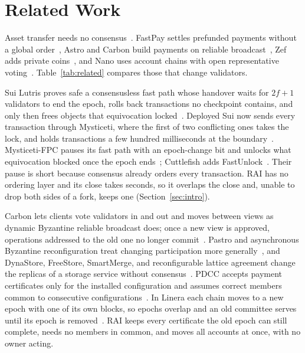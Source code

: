 \section{Related Work}
\label{sec:related}



Asset transfer needs no consensus~\cite{consensusnumber}. FastPay settles prefunded payments without a global order~\cite{fastpay}, Astro and Carbon build payments on reliable broadcast~\cite{astro,camaioni2024carbon}, Zef adds private coins~\cite{zef}, and Nano uses account chains with open representative voting~\cite{nano}. Table~\ref{tab:related} compares those that change validators.

Sui Lutris proves safe a consensusless fast path whose handover waits for $2f+1$ validators to end the epoch, rolls back transactions no checkpoint contains, and only then frees objects that equivocation locked~\cite{lutris}. Deployed Sui now sends every transaction through Mysticeti, where the first of two conflicting ones takes the lock, and holds transactions a few hundred milliseconds at the boundary~\cite{suimysticetiv2,sui2026epochs,sui2026lifecycle}. Mysticeti-FPC pauses its fast path with an epoch-change bit and unlocks what equivocation blocked once the epoch ends~\cite{babel2025mysticeti}; Cuttlefish adds FastUnlock~\cite{cuttlefish}. Their pause is short because consensus already orders every transaction. RAI has no ordering layer and its close takes seconds, so it overlaps the close and, unable to drop both sides of a fork, keeps one (Section~\ref{sec:intro}).

Carbon lets clients vote validators in and out and moves between views as dynamic Byzantine reliable broadcast does; once a new view is approved, operations addressed to the old one no longer commit~\cite{camaioni2024carbon,guerraoui2020dbrb}. Pastro and asynchronous Byzantine reconfiguration treat changing participation more generally~\cite{pastro,reconfiguration}, and DynaStore, FreeStore, SmartMerge, and reconfigurable lattice agreement change the replicas of a storage service without consensus~\cite{aguilera2011dynastore,alchieri2017freestore,jehl2015smartmerge,kuznetsov2019rla}. PDCC accepts payment certificates only for the installed configuration and assumes correct members common to consecutive configurations~\cite{pdcc}. In Linera each chain moves to a new epoch with one of its own blocks, so epochs overlap and an old committee serves until its epoch is removed~\cite{linera2026docs,linera2026execution}. RAI keeps every certificate the old epoch can still complete, needs no members in common, and moves all accounts at once, with no owner acting.

